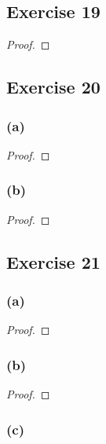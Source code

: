 \documentclass[14pt]{extarticle}
\begin{document}
\subsection{Exercise 19}

\begin{proof}

\end{proof}

\subsection{Exercise 20}

\subsubsection{(a)}

\begin{proof}

\end{proof}

\subsubsection{(b)}

\begin{proof}

\end{proof}

\subsection{Exercise 21}

\subsubsection{(a)}

\begin{proof}

\end{proof}

\subsubsection{(b)}

\begin{proof}

\end{proof}

\subsubsection{(c)}
\end{document}
